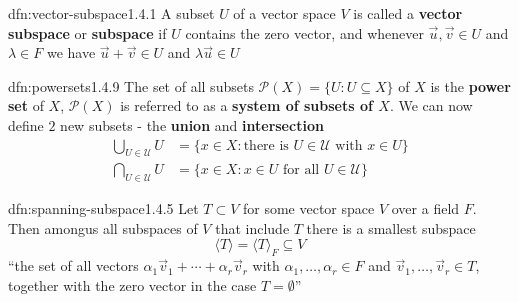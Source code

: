 \documentclass[landscape, 8pt]{extarticle}
\begin{document}
\begin{multicols}{3}
%
%
%

\begin{dfn}{dfn:vector-subspace}{1.4.1}
    A subset $U$ of a vector space $V$ is called a \textbf{vector subspace} or \textbf{subspace} if $U$ contains the zero vector, and whenever $\vec{u},\vec{v}\in U$ and $\lambda\in F$ we have $\vec{u} + \vec{v}\in U$ and $\lambda \vec{u}\in U$
\end{dfn}

\begin{dfn}{dfn:powersets}{1.4.9}
    The set of all subsets $\mathcal{P}(X) = \{U : U\subseteq X\}$ of $X$ is the \textbf{power set} of $X$, $\mathcal{P}(X)$ is referred to as a \textbf{system of subsets of $X$}. We can now define $2$ new subsets - the \textbf{union} and \textbf{intersection}
    \begin{align*}
        \bigcup\limits_{U \in\mathcal{U}} U &= \{x \in X : \text{there is $U\in \mathcal{U}$ with $x\in U$}\} \\
        \bigcap\limits_{U \in\mathcal{U}} U &= \{x \in X : \text{$x\in U$ for all $U\in \mathcal{U}$}\}
    \end{align*}
\end{dfn}

\begin{dfn}{dfn:spanning-subspace}{1.4.5}
    Let $T \subset V$ for some vector space $V$ over a field $F$. Then amongus all subspaces of $V$ that include $T$ there is a smallest subspace
    \[\langle T \rangle = \langle T \rangle_{F} \subseteq V\]
    ``the set of all vectors $\alpha_{1}\vec{v}_{1} + \cdots + \alpha_{r}\vec{v}_{r}$ with $\alpha_{1},\dots,\alpha_{r}\in F$ and $\vec{v}_{1},\dots,\vec{v}_{r}\in T$, together with the zero vector in the case $T = \emptyset$''


\end{dfn}
\end{multicols}
\end{document}
